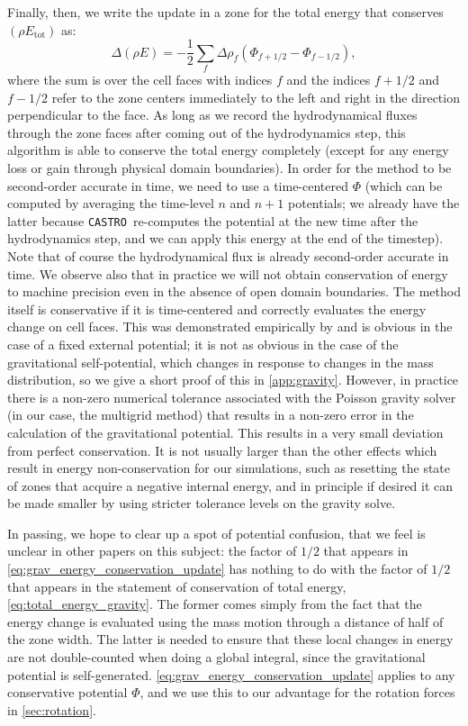\documentclass[iop,numberedappendix]{../emulateapj}
\newcommand{\castro}{\texttt{CASTRO}}
\begin{document}
Finally, then, we write the update in a zone for the total energy that conserves $(\rho E_{\text{tot}})$ as:
\begin{equation}
  \Delta (\rho E) = -\frac{1}{2}\sum_{f} \Delta \rho_{f} (\Phi_{f+1/2} - \Phi_{f-1/2}),\label{eq:grav_energy_conservation_update}
\end{equation}
where the sum is over the cell faces with indices $f$ and the indices $f+1/2$ and $f-1/2$ refer to 
the zone centers immediately to the left and right in the direction perpendicular to the face.
As long as we record the hydrodynamical fluxes through the zone faces after coming out of the hydrodynamics step, 
this algorithm is able to conserve the total energy completely (except for any energy loss or gain through 
physical domain boundaries). In order for the method to be second-order accurate in time, 
we need to use a time-centered $\Phi$ (which can be computed by averaging the time-level $n$ and $n+1$ potentials;
we already have the latter because \castro\ re-computes the potential at the new time after the hydrodynamics step,
and we can apply this energy at the end of the timestep). Note that of course the hydrodynamical
flux is already second-order accurate in time. We observe also that in practice we will not obtain 
conservation of energy to machine precision even in the absence of open domain boundaries. The 
method itself is conservative if it is time-centered and correctly evaluates the energy change 
on cell faces. This was demonstrated empirically by \cite{jiang:2013} and is obvious in the case of a
fixed external potential; it is not as obvious in the case of the gravitational self-potential, which
changes in response to changes in the mass distribution, so we give a short proof of this in
\autoref{app:gravity}. However, in practice there is a non-zero numerical tolerance associated 
with the Poisson gravity solver (in our case, the multigrid method) that results in a non-zero error 
in the calculation of the gravitational potential. This results in a very small deviation from perfect 
conservation. It is not usually larger than the other effects which result in energy non-conservation 
for our simulations, such as resetting the state of zones that acquire a negative internal energy, and 
in principle if desired it can be made smaller by using stricter tolerance levels on the gravity solve.

In passing, we hope to clear up a spot of potential confusion, that we feel is unclear in other papers
on this subject: the factor of $1/2$ that appears in \autoref{eq:grav_energy_conservation_update} 
has nothing to do with the factor of $1/2$ that appears in the statement of conservation of total energy, 
\autoref{eq:total_energy_gravity}. The former comes simply from the fact that the energy change is 
evaluated using the mass motion through a distance of half of the zone width. The latter is needed 
to ensure that these local changes in energy are not double-counted when doing a global integral, 
since the gravitational potential is self-generated. \autoref{eq:grav_energy_conservation_update} 
applies to any conservative potential $\Phi$, and we use this to our advantage for the 
rotation forces in \autoref{sec:rotation}.
\end{document}
